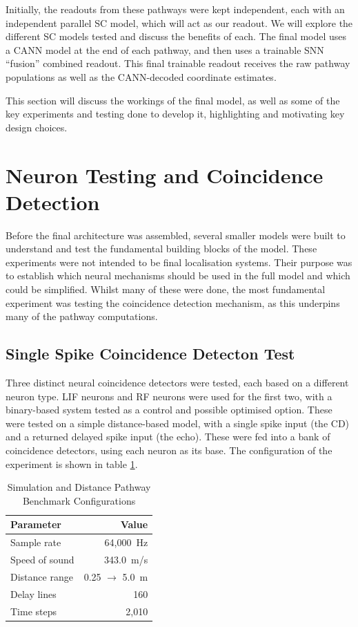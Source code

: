 Initially, the readouts from these pathways were kept independent, each with an independent parallel SC model, which will act as our readout. We will explore the different SC models tested and discuss the benefits of each. The final model uses a CANN model at the end of each pathway, and then uses a trainable SNN ``fusion'' combined readout. This final trainable readout receives the raw pathway populations as well as the CANN-decoded coordinate estimates.

This section will discuss the workings of the final model, as well as some of the key experiments and testing done to develop it, highlighting and motivating key design choices.

\section{Neuron Testing and Coincidence Detection}

Before the final architecture was assembled, several smaller models were built to understand and test the fundamental building blocks of the model. These experiments were not intended to be final localisation systems. Their purpose was to establish which neural mechanisms should be used in the full model and which could be simplified. Whilst many of these were done, the most fundamental experiment was testing the coincidence detection mechanism, as this underpins many of the pathway computations.

\subsection{Single Spike Coincidence Detecton Test}

Three distinct neural coincidence detectors were tested, each based on a different neuron type. LIF neurons and RF neurons were used for the first two, with a binary-based system tested as a control and possible optimised option. These were tested on a simple distance-based model, with a single spike input (the CD) and a returned delayed spike input (the echo).  These were fed into a bank of coincidence detectors, using each neuron as its base. The configuration of the experiment is shown in table \ref{tab:simulation_parameters}.

\begin{table}[htbp]
\centering
\caption{Simulation and Distance Pathway Benchmark Configurations}
\label{tab:simulation_parameters}
\begin{tabular}{l r}
\hline
\textbf{Parameter} & \textbf{Value} \\ \hline
Sample rate & 64,000~Hz \\
Speed of sound & 343.0~m/s \\
Distance range & 0.25 $\rightarrow$ 5.0~m \\
Delay lines & 160 \\
Time steps & 2,010 \\ \hline
\end{tabular}
\end{table}


